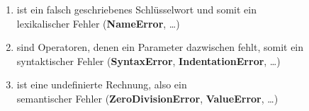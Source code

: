 \begin{enumerate}
    \item {} ist ein falsch geschriebenes Schlüsselwort und
        somit ein \\ lexikalischer Fehler (\textbf{NameError}, \dots)
    \item {} sind Operatoren, denen ein Parameter dazwischen
        fehlt, somit ein
        \\ syntaktischer Fehler (\textbf{SyntaxError}, \textbf{IndentationError}, \dots)
    \item {} ist eine undefinierte Rechnung, also ein
        \\ semantischer Fehler (\textbf{ZeroDivisionError}, \textbf{ValueError}, \dots)
\end{enumerate}
